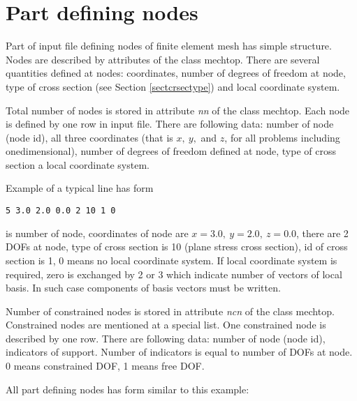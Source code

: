 \section{Part defining nodes}

Part of input file defining nodes of finite element mesh has simple structure. Nodes are described by attributes
of the class {\sf mechtop}. There are several quantities defined at nodes: coordinates, number of degrees of
freedom at node, type of cross section (see Section \ref{sectcrsectype}) and local coordinate system.

Total number of nodes is stored in attribute {\it nn} of the class {\sf mechtop}.
Each node is defined by one row in input file. There are following data: number of node (node id), all three coordinates
(that is $x,\ y,$ and $z$, for all problems including onedimensional), number of degrees of freedom defined at node,
type of cross section a local coordinate system.

Example of a typical line has form

\noindent
{\tt 5  3.0 2.0 0.0   2  10 1  0}

 is number of node, coordinates of node are $x=3.0,\ y=2.0,\ z=0.0$, there are 2 DOFs at node, type of
cross section is 10 (plane stress cross section), id of cross section is 1, 0 means no local coordinate
system. If local coordinate system is required, zero is exchanged by 2 or 3 which indicate number of vectors
of local basis. In such case components of basis vectors must be written.

Number of constrained nodes is stored in attribute {\it ncn} of the class {\sf mechtop}.
Constrained nodes are mentioned at a special list. One constrained node is described by one row.
There are following data: number of node (node id), indicators of support. Number of indicators
is equal to number of DOFs at node. 0 means constrained DOF, 1 means free DOF.

All part defining nodes has form similar to this example:

